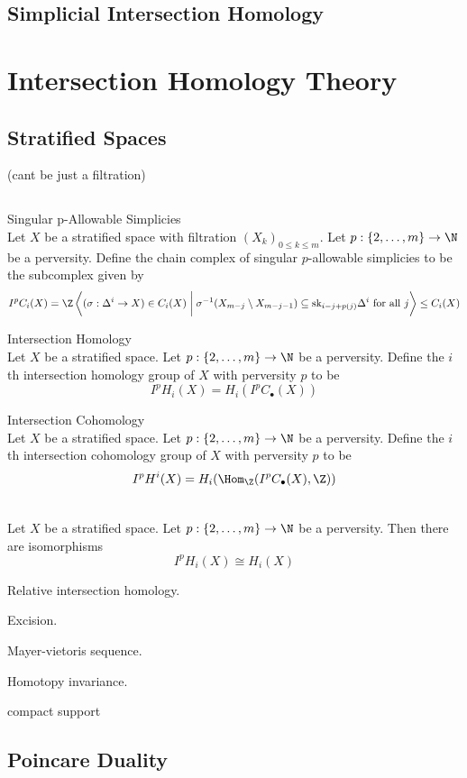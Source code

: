\documentclass[a4paper]{article}
\begin{document}
\subsection{Simplicial Intersection Homology}

\pagebreak
\section{Intersection Homology Theory}
\subsection{Stratified Spaces}
(cant be just a filtration)
\subsection{}
\begin{defn}{Singular p-Allowable Simplicies}{}\\
Let $X$ be a stratified space with filtration $(X_k)_{0\leq k\leq m}$. Let $p:\{2,\dots,m\}\to\N$ be a perversity. Define the chain complex of singular $p$-allowable simplicies to be the subcomplex given by $$I^pC_i(X)=\Z\left\langle(\sigma:\Delta^i\to X)\in C_i(X)\;\bigg{|}\;\sigma^{-1}(X_{m-j}\setminus X_{m-j-1})\subseteq\text{sk}_{i-j+p(j)}\Delta^i\text{ for all }j\right\rangle\leq C_i(X)$$
\end{defn}

\begin{defn}{Intersection Homology}{}\\
Let $X$ be a stratified space. Let $p:\{2,\dots,m\}\to\N$ be a perversity. Define the $i$th intersection homology group of $X$ with perversity $p$ to be $$I^pH_i(X)=H_i(I^pC_\bullet(X))$$
\end{defn}

\begin{defn}{Intersection Cohomology}{}\\
Let $X$ be a stratified space. Let $p:\{2,\dots,m\}\to\N$ be a perversity. Define the $i$th intersection cohomology group of $X$ with perversity $p$ to be $$I^pH^i(X)=H_i(\Hom_\Z(I^pC_\bullet(X),\Z))$$
\end{defn}

\begin{lmm}{}{}\\
Let $X$ be a stratified space. Let $p:\{2,\dots,m\}\to\N$ be a perversity. Then there are isomorphisms $$I^pH_i(X)\cong H_i(X)$$
\end{lmm}

Relative intersection homology. 

Excision. 

Mayer-vietoris sequence. 

Homotopy invariance. 

compact support

\subsection{Poincare Duality}
\end{document}

